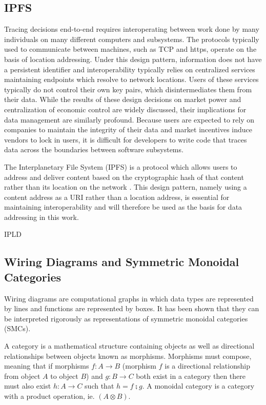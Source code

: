 \documentclass[9pt, oneside]{article}   	%
\begin{document}
\begin{multicols}{2}
\subsection{IPFS}\label{IPFS}
Tracing decisions end-to-end requires interoperating between work done by many individuals on many different computers and subsystems. The protocols typically used to communicate between machines, such as TCP and https, operate on the basis of location addressing. Under this design pattern, information does not have a persistent identifier and interoperability typically relies on centralized services maintaining endpoints which resolve to network locations. Users of these services typically do not control their own key pairs, which disintermediates them from their data. While the results of these design decisions on market power and centralization of economic control are widely discussed, their implications for data management are similarly profound. Because users are expected to rely on companies to maintain the integrity of their data and market incentives induce vendors to lock in users, it is difficult for developers to write code that traces data across the boundaries between software subsystems.

The Interplanetary File System (IPFS) is a protocol which allows users to address and deliver content based on the cryptographic hash of that content rather than its location on the network \cite{ipfs-paper}. This design pattern, namely using a content address as a URI rather than a location address, is essential for maintaining interoperability and will therefore be used as the basis for data addressing in this work.


IPLD

\subsection{Wiring Diagrams and Symmetric Monoidal Categories}\label{smc}

Wiring diagrams are computational graphs in which data types are represented by lines and functions are represented by boxes. It has been shown that they can be interpreted rigorously as representations of symmetric monoidal categories (SMCs). \cite{Patterson_2021} 


A category is a mathematical structure containing objects as well as directional relationships between objects known as morphisms. Morphisms must compose, meaning that if morphisms $f : A \rightarrow B$ (morphism $f$ is a directional relationship from object $A$ to object $B$) and $g : B \rightarrow C$ both exist in a category then there must also exist $h : A \rightarrow C$ such that $h = f \zcmp g$. A monoidal category is a category with a product operation, ie. $(A \otimes B)$. 


\end{multicols}
\end{document}
